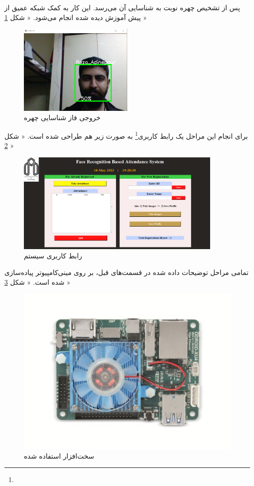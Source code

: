 \documentclass[12pt]{article}
\begin{document}
پس از تشخیص چهره نوبت به شناسایی آن می‌رسد. این کار به کمک شبکه عمیق از پیش آموزش دیده شده انجام می‌شود. « شکل \ref{شناسایی‌چهره} »
\begin{figure}[h]
	\centering
	\includegraphics[width=0.5\textwidth]{images/face_recog}
	\caption{خروجی فاز شناسایی چهره}
	\label{شناسایی‌چهره}
\end{figure}

\newpage

برای انجام این مراحل یک رابط کاربری\footnote{} به صورت زیر هم طراحی شده است. « شکل \ref{رابط کاربری} »
\begin{figure}[h]
	\centering
	\includegraphics[width=0.9\textwidth]{images/user_interface}
	\caption{رابط کاربری سیستم}
	\label{رابط کاربری}
\end{figure}

\newpage

تمامی مراحل توضیحات داده شده در قسمت‌های قبل، بر روی مینی‌کامپیوتر  پیاده‌سازی شده است. « شکل \ref{اودروید} »
\begin{figure}[h]
	\centering
	\includegraphics[width=1\textwidth]{images/odroid}
	\caption{سخت‌افزار استفاده شده}
	\label{اودروید}
\end{figure}
\end{document}
